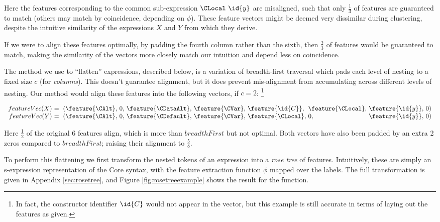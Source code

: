Here the features corresponding to the common sub-expression $\CLocal\ \id{y}$
are misaligned, such that only $\frac{1}{3}$ of features are guaranteed to match
(others may match by coincidence, depending on $\phi$). These feature vectors
might be deemed very dissimilar during clustering, despite the intuitive
similarity of the expressions $X$ and $Y$ from which they derive.

If we were to align these features optimally, by padding the fourth column
rather than the sixth, then $\frac{2}{3}$ of features would be guaranteed to
match, making the similarity of the vectors more closely match our intuition and
depend less on coincidence.

The method we use to ``flatten'' expressions, described below, is a variation of
breadth-first traversal which pads each level of nesting to a fixed size $c$
(for \emph{columns}). This doesn't guarantee alignment, but it does prevent
mis-alignment from accumulating across different levels of nesting. Our method
would align these features into the following vectors, if $c = 2$: \footnote{In
  fact, the constructor identifier $\id{C}$ would not appear in the vector, but
  this example is still accurate in terms of laying out the features as given.}

\begin{small}
  \begin{equation}\label{eq:flattened}
    \begin{array}{r@{}l@{}l@{}l@{}l@{}l@{}l@{}l@{}l@{}l}
      featureVec(X)\ &=\ (\feature{\CAlt},\ &0,\ &\feature{\CDataAlt},\ &\feature{\CVar},\ &\feature{\id{C}},\  &\feature{\CLocal},\ &\feature{\id{y}},\ &0 &) \\
      featureVec(Y)\ &=\ (\feature{\CAlt},\ &0,\ &\feature{\CDefault},\ &\feature{\CVar},\ &\feature{\CLocal},\ &0,\                 &\feature{\id{y}},\ &0 &)
    \end{array}
  \end{equation}
\end{small}

Here $\frac{1}{2}$ of the original 6 features align, which is more than
$breadthFirst$ but not optimal. Both vectors have also been padded by an extra 2
zeros compared to $breadthFirst$; raising their alignment to $\frac{5}{8}$.

To perform this flattening we first transform the nested tokens of an expression
into a \emph{rose tree} of features. Intuitively, these are simply an
s-expression representation of the Core syntax, with the feature extraction
function $\phi$ mapped over the labels. The full transformation is given in
Appendix \ref{sec:rosetree}, and Figure \ref{fig:rosetreeexample} shows the
result for the  function.

